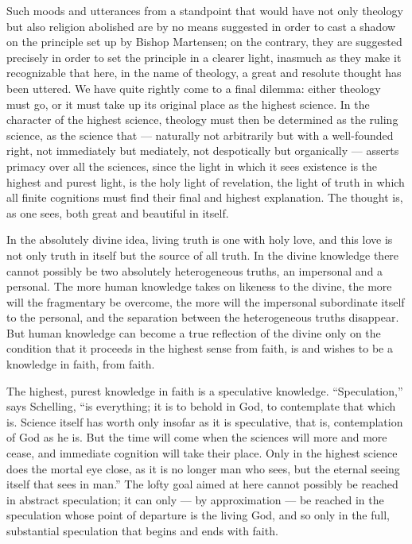 \documentclass[12pt]{book}
\newcommand{\opage}[1]{\marginnote{\footnotesize\textit{[#1]}}}
\begin{document}
\opage{4}\setcounter{footnote}{0}%
Such moods and utterances from a standpoint that would have not only theology but also religion abolished are by no means suggested in order to cast a shadow on the principle set up by Bishop Martensen; on the contrary, they are suggested precisely in order to set the principle in a clearer light, inasmuch as they make it recognizable that here, in the name of theology, a great and resolute thought has been uttered. We have quite rightly come to a final dilemma: either theology must go, or it must take up its original place as the highest science. In the character of the highest science, theology must then be determined as the ruling science, as the science that --- naturally not arbitrarily but with a well-founded right, not immediately but mediately, not despotically but organically --- asserts primacy over all the sciences, since the light in which it sees existence is the highest and purest light, is the holy light of revelation, the light of truth in which all finite cognitions must find their final and highest explanation. The thought is, as one sees, both great and beautiful in itself.

In the absolutely divine idea, living truth is one with holy love, and this love is not only truth in itself but the source of all truth. In the divine knowledge there cannot possibly be two absolutely heterogeneous truths, an impersonal and a personal. The more human knowledge takes on likeness to the divine, the more will the fragmentary be overcome, the more will the impersonal subordinate itself to the personal, and the separation between the heterogeneous truths disappear. But human knowledge can become a true reflection of the divine only on the condition that it proceeds in the highest sense from faith, is and wishes to be a knowledge in faith, from faith.

The highest, purest knowledge in faith is a speculative knowledge. ``Speculation,'' says Schelling, ``is everything; it is to behold in God, to contemplate that which is. Science itself has
\opage{5}\setcounter{footnote}{0}%
worth only insofar as it is speculative, that is, contemplation of God as he is. But the time will come when the sciences will more and more cease, and immediate cognition will take their place. Only in the highest science does the mortal eye close, as it is no longer man who sees, but the eternal seeing itself that sees in man.'' The lofty goal aimed at here cannot possibly be reached in abstract speculation; it can only --- by approximation --- be reached in the speculation whose point of departure is the living God, and so only in the full, substantial speculation that begins and ends with faith.
\end{document}

